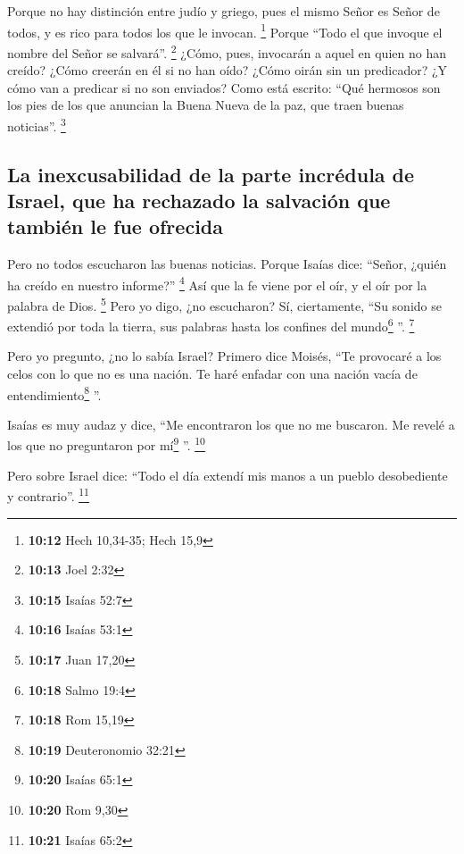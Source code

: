 \begin{paracol}{2}
 Porque no hay distinción entre judío y griego, pues el
mismo Señor es Señor de todos, y es rico para todos los que le invocan.
\footnote{\textbf{10:12} Hech 10,34-35; Hech 15,9} 
Porque ``Todo el que invoque el nombre del Señor se salvará''.
\footnote{\textbf{10:13} Joel 2:32}  ¿Cómo, pues,
invocarán a aquel en quien no han creído? ¿Cómo creerán en él si no han
oído? ¿Cómo oirán sin un predicador?  ¿Y cómo van a
predicar si no son enviados? Como está escrito: ``Qué hermosos son los
pies de los que anuncian la Buena Nueva de la paz, que traen buenas
noticias''. \footnote{\textbf{10:15} Isaías 52:7}

\hypertarget{la-inexcusabilidad-de-la-parte-incruxe9dula-de-israel-que-ha-rechazado-la-salvaciuxf3n-que-tambiuxe9n-le-fue-ofrecida}{%
\subsection{La inexcusabilidad de la parte incrédula de Israel, que ha
rechazado la salvación que también le fue
ofrecida}\label{la-inexcusabilidad-de-la-parte-incruxe9dula-de-israel-que-ha-rechazado-la-salvaciuxf3n-que-tambiuxe9n-le-fue-ofrecida}}

 Pero no todos escucharon las buenas noticias. Porque
Isaías dice: ``Señor, ¿quién ha creído en nuestro informe?'' \footnote{\textbf{10:16}
  Isaías 53:1}  Así que la fe viene por el oír, y el oír
por la palabra de Dios. \footnote{\textbf{10:17} Juan 17,20}
 Pero yo digo, ¿no escucharon? Sí, ciertamente, ``Su
sonido se extendió por toda la tierra, sus palabras hasta los confines
del mundo\footnote{\textbf{10:18} Salmo 19:4} ''. \footnote{\textbf{10:18}
  Rom 15,19}

 Pero yo pregunto, ¿no lo sabía Israel? Primero dice
Moisés, ``Te provocaré a los celos con lo que no es una nación. Te haré
enfadar con una nación vacía de entendimiento\footnote{\textbf{10:19}
  Deuteronomio 32:21} ''.

 Isaías es muy audaz y dice, ``Me encontraron los que no
me buscaron. Me revelé a los que no preguntaron por mí\footnote{\textbf{10:20}
  Isaías 65:1} ''. \footnote{\textbf{10:20} Rom 9,30}

 Pero sobre Israel dice: ``Todo el día extendí mis manos
a un pueblo desobediente y contrario''. \footnote{\textbf{10:21} Isaías
  65:2}

\switchcolumn
\begin{otherlanguage}{english}


\end{otherlanguage}
\end{paracol}
